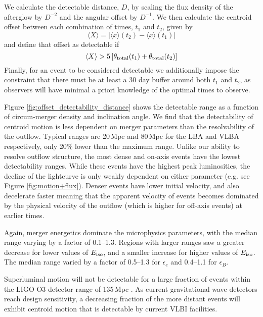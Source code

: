 We calculate the detectable distance, $D$, by scaling the flux density of the afterglow by $D^{-2}$ and the angular offset by $D^{-1}$. We then calculate the centroid offset between each combination of times, $t_1$ and $t_2$, given by
\begin{equation}
    \langle X\rangle = |\langle x\rangle(t_2)-\langle x\rangle(t_1)|
\end{equation}
and define that offset as detectable if 
\begin{equation}
    \langle X\rangle > 5\left[\theta_{\rm total}(t_1)+\theta_{\rm total}(t_2)\right]
\end{equation}
Finally, for an event to be considered detectable we additionally impose the constraint that there must be at least a 30 day buffer around both $t_1$ and $t_2$, as observers will have minimal a priori knowledge of the optimal times to observe.


Figure \ref{fig:offset_detectability_distance} shows the detectable range as a function of circum-merger density and inclination angle. We find that the detectability of centroid motion is less dependent on merger parameters than the resolvability of the outflow. Typical ranges are 20\,Mpc and 80\,Mpc for the LBA and VLBA respectively, only 20\% lower than the maximum range. Unlike our ability to resolve outflow structure, the most dense and on-axis events have the lowest detectability ranges. While these events have the highest peak luminosities, the decline of the lightcurve is only weakly dependent on either parameter (e.g. see Figure \ref{fig:motion+flux}). Denser events have lower initial velocity, and also decelerate faster meaning that the apparent velocity of events becomes dominated by the physical velocity of the outflow (which is higher for off-axis events) at earlier times.

Again, merger energetics dominate the microphysics parameters, with the median range varying by a factor of 0.1--1.3. Regions with larger ranges saw a greater decrease for lower values of $E_{\rm iso}$, and a smaller increase for higher values of $E_{\rm iso}$. The median range varied by a factor of 0.5--1.3 for $\epsilon_e$ and 0.4--1.1 for $\epsilon_B$.

Superluminal motion will not be detectable for a large fraction of events within the LIGO O3 detector range of 135\,Mpc \citep{2018LRR....21....3A}. As current gravitational wave detectors reach design sensitivity, a decreasing fraction of the more distant events will exhibit centroid motion that is detectable by current VLBI facilities.

